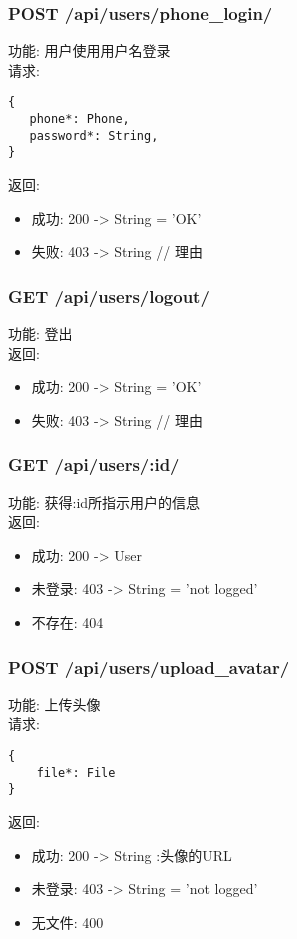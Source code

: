 \begin{enumerate}
\subsubsection{POST /api/users/phone\_login/}

\noindent
功能: 用户使用用户名登录\\
请求:
\begin{lstlisting}[numbers=none, frame=none]
{
   phone*: Phone,
   password*: String,
}
\end{lstlisting}
返回:
\begin{itemize}
	\item 成功:  200 -> String = 'OK'
	\item 失败:  403 -> String // 理由
\end{itemize}

\subsubsection{GET /api/users/logout/}

\noindent
功能: 登出\\
返回:
\begin{itemize}
	\item 成功:  200 -> String = 'OK'
	\item 失败:  403 -> String // 理由
\end{itemize}


\subsubsection{GET /api/users/:id/}

\noindent
功能: 获得:id所指示用户的信息\\
返回:
\begin{itemize}
	\item 成功:  200 -> User
	\item 未登录:  403 -> String = 'not logged'
	\item 不存在:  404
\end{itemize}



\subsubsection{POST /api/users/upload\_avatar/}

\noindent
功能: 上传头像\\
请求: 
\begin{lstlisting}[numbers=none, frame=none]
{
    file*: File
}
\end{lstlisting}
返回:
\begin{itemize}
	\item 成功:  200 -> String :头像的URL
	\item 未登录:  403 -> String = 'not logged'
	\item 无文件: 400
\end{itemize}



\end{enumerate}
